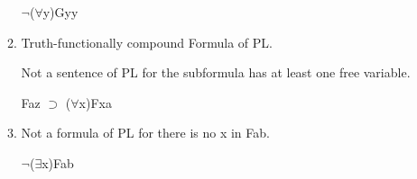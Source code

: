\documentclass[12pt,letterpaper]{article}
\begin{document}
\begin{enumerate}
\begin{enumerate}
          \underline{$\neg$}($\forall$y)Gyy
        \item
          Truth-functionally compound Formula of PL.

          Not a sentence of PL for the subformula has at least one free variable.

          Faz \underline{$\supset$} ($\forall$x)Fxa
        \item
          Not a formula of PL for there is no x in Fab.

          $\neg$($\exists$x)Fab
      \end{enumerate}
  \end{enumerate}
\end{document}
